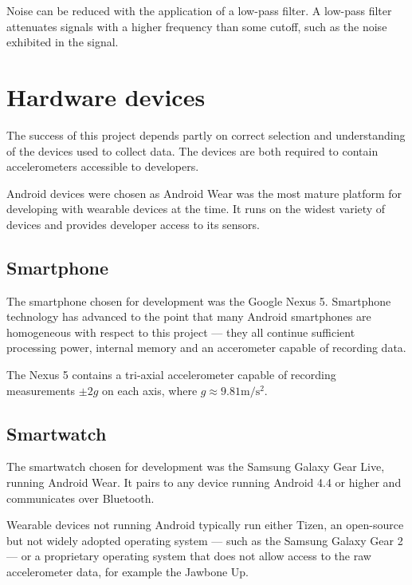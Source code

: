       
      Noise can be reduced with the application of a low-pass filter. A low-pass filter attenuates signals with a higher frequency than some cutoff, such as the noise exhibited in the signal.
      
  
  \section{Hardware devices}
    The success of this project depends partly on correct selection and understanding of the devices
    used to collect data. The devices are both required to contain accelerometers accessible to
    developers.
    
    Android devices were chosen as Android Wear was the most mature platform for developing with
    wearable devices at the time. It runs on the widest variety of devices and provides developer 
    access to its sensors.
    
    \subsection{Smartphone}
      The smartphone chosen for development was the Google Nexus 5. Smartphone technology has
      advanced to the point that many Android smartphones are homogeneous with respect to this
      project --- they all continue sufficient processing power, internal memory and an 
      accerometer capable of recording data.
      
      The Nexus 5 contains a tri-axial accelerometer capable of recording measurements $\pm2\si{g}$
      on each axis, where $\si{g} \approx 9.81\si{\metre\per\square\second}$.
      
    
    \subsection{Smartwatch}
      \label{sec:smartwatch}
      The smartwatch chosen for development was the Samsung Galaxy Gear Live, running Android Wear.
      It pairs to any device running Android 4.4 or higher and communicates over Bluetooth.
      
      Wearable devices not running Android typically run either Tizen, an open-source but not 
      widely adopted operating system --- such as the Samsung Galaxy Gear 2 --- or a proprietary 
      operating system that does not allow access to the raw accelerometer data, for example the 
      Jawbone Up.
      
